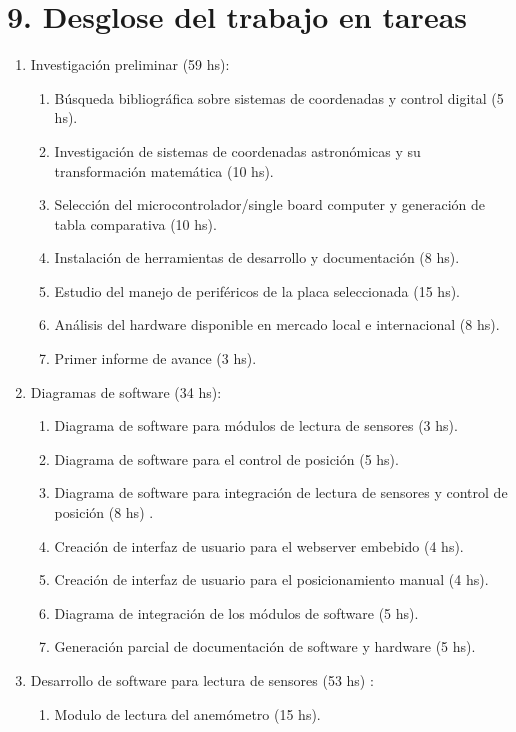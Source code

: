 \documentclass[11pt, %
codirector, %
]{charter}
\begin{document}
\section{9. Desglose del trabajo en tareas}
\label{sec:wbs}

\begin{enumerate}
\item Investigación preliminar (59 hs): 
	\begin{enumerate}
	\item Búsqueda bibliográfica sobre sistemas de coordenadas y control digital (5 hs). 
	\item Investigación de sistemas de coordenadas astronómicas y su transformación matemática (10 hs). 
	\item Selección del microcontrolador/single board computer y generación de tabla comparativa (10 hs).  
	\item Instalación de herramientas de desarrollo y documentación (8 hs).
	\item Estudio del manejo de periféricos de la placa seleccionada (15 hs).
	\item Análisis del hardware disponible en mercado local e internacional (8 hs).
	\item Primer informe de avance (3 hs).  
	\end{enumerate}
\item Diagramas de software (34 hs): 
	\begin{enumerate}
		\item Diagrama de software para módulos de lectura de sensores (3 hs).  
		\item Diagrama de software para el control de posición (5 hs). 
		\item Diagrama de software para integración de lectura de sensores y control de posición (8 hs) . 
		\item Creación de interfaz de usuario para el webserver embebido (4 hs).
		\item Creación de interfaz de usuario para el posicionamiento manual (4 hs).
		\item Diagrama de integración de los módulos de software (5 hs). 
		\item Generación parcial de documentación de software y hardware (5 hs).
	\end{enumerate}
\item Desarrollo de software para lectura de sensores (53 hs) :
	\begin{enumerate}
	\item Modulo de lectura del anemómetro (15 hs). 

\end{enumerate}
\end{enumerate}
\end{document}
